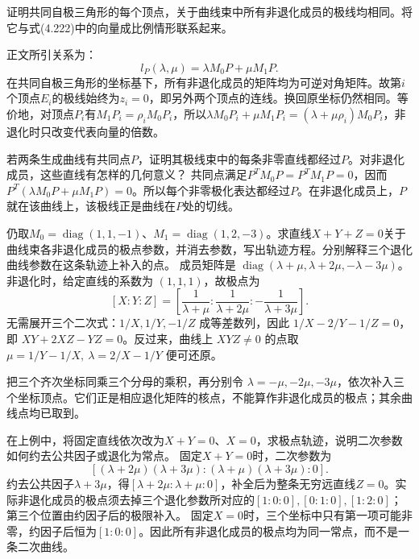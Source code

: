证明共同自极三角形的每个顶点，关于曲线束中所有非退化成员的极线均相同。将它与式\textup{(4.222)}中的向量成比例情形联系起来。

\par\smallskip\noindent 正文所引关系为：
\begin{equation*}
l_P(\lambda,\mu)=\lambda M_0P+\mu M_1P.
\end{equation*}
\solutionanswer
在共同自极三角形的坐标基下，所有非退化成员的矩阵均为可逆对角矩阵。故第\(i\)个顶点\(E_i\)的极线始终为\(z_i=0\)，即另外两个顶点的连线。换回原坐标仍然相同。等价地，对顶点\(P_i\)有\(M_1P_i=\rho_iM_0P_i\)，所以\(\lambda M_0P_i+\mu M_1P_i=(\lambda+\mu\rho_i)M_0P_i\)，非退化时只改变代表向量的倍数。


若两条生成曲线有共同点\(P\)，证明其极线束中的每条非零直线都经过\(P\)。对非退化成员，这些直线有怎样的几何意义？
\solutionanswer
共同点满足\(P^TM_0P=P^TM_1P=0\)，因而\(P^T(\lambda M_0P+\mu M_1P)=0\)。所以每个非零极化表达都经过\(P\)。在非退化成员上，\(P\)就在该曲线上，该极线正是曲线在\(P\)处的切线。


仍取\(M_0=\operatorname{diag}(1,1,-1)\)、\(M_1=\operatorname{diag}(1,2,-3)\)。求直线\(X+Y+Z=0\)关于曲线束各非退化成员的极点参数，并消去参数，写出轨迹方程。分别解释三个退化曲线参数在这条轨迹上补入的点。
\solutionanswer
成员矩阵是 \(\operatorname{diag}(\lambda+\mu,\lambda+2\mu,-\lambda-3\mu)\)。非退化时，给定直线的系数为 \((1,1,1)\)，故极点为
\[
 [X:Y:Z]=\left[\frac1{\lambda+\mu}:\frac1{\lambda+2\mu}:
                    -\frac1{\lambda+3\mu}\right].
\]
无需展开三个二次式：\(1/X,1/Y,-1/Z\) 成等差数列，因此 \(1/X-2/Y-1/Z=0\)，即 \(XY+2XZ-YZ=0\)。反过来，曲线上 \(XYZ\ne0\) 的点取 \(\mu=1/Y-1/X,\ \lambda=2/X-1/Y\) 便可还原。

把三个齐次坐标同乘三个分母的乘积，再分别令 \(\lambda=-\mu,-2\mu,-3\mu\)，依次补入三个坐标顶点。它们正是相应退化矩阵的核点，不能算作非退化成员的极点；其余曲线点均已取到。


在上例中，将固定直线依次改为\(X+Y=0\)、\(X=0\)，求极点轨迹，说明二次参数如何约去公共因子或退化为常点。
\solutionanswer
固定\(X+Y=0\)时，二次参数为
\[
 [(\lambda+2\mu)(\lambda+3\mu):(\lambda+\mu)(\lambda+3\mu):0].
\]
约去公共因子\(\lambda+3\mu\)，得\([\lambda+2\mu:\lambda+\mu:0]\)，补全后为整条无穷远直线\(Z=0\)。实际非退化成员的极点须去掉三个退化参数所对应的\([1:0:0],[0:1:0],[1:2:0]\)；第三个位置由约因子后的极限补入。
固定\(X=0\)时，三个坐标中只有第一项可能非零，约因子后恒为\([1:0:0]\)。因此所有非退化成员的极点均为同一常点，而不是一条二次曲线。


